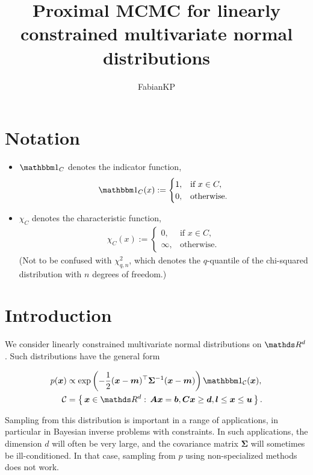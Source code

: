 \documentclass[10pt]{article}
\title{Proximal MCMC for linearly constrained multivariate normal distributions}
\author{FabianKP}
\date{}
\numberwithin{equation}{section}
\begin{document}
\maketitle

\section*{Notation}

\begin{itemize}
\item $\indicator{C}$ denotes the indicator function,
\begin{align*}
\indicator{C}(x) := \begin{cases}
1, & \text{if } x \in C, \\
0, & \text{otherwise}.
\end{cases}
\end{align*}
\item $\chi_{C}$ denotes the characteristic function,
\begin{align*}
\chi_C(x) := \begin{cases}
0, & \text{if } x \in C, \\
\infty, & \text{otherwise}.
\end{cases}
\end{align*}
(Not to be confused with $\chi_{q, n}^2$, which denotes the $q$-quantile of the chi-squared distribution with $n$ degrees of freedom.)
\end{itemize}


\section{Introduction}

We consider linearly constrained multivariate normal distributions on $\R^d$. Such distributions have the general form

\begin{equation}
\begin{aligned}
p(\bm x) & \propto \exp \left( - \frac{1}{2} (\bm x - \bm m)^\top \bm \Sigma^{-1} (\bm x - \bm m) \right) \indicator{\mathcal C}(\bm x), \\
\mathcal C &= \Set{\bm x \in \R^d}{\bm A \bm x = \bm b, \bm C \bm x \geq \bm d, \bm l \leq \bm x \leq \bm u}.
\end{aligned}\label{eq:pdf_basic_form}
\end{equation}

Sampling from this distribution is important in a range of applications, in particular in Bayesian inverse problems with constraints. In such applications, the dimension $d$ will often be very large, and the covariance matrix $\bm \Sigma$ will sometimes be ill-conditioned. In that case, sampling from $p$ using non-specialized methods does not work.
\end{document}

